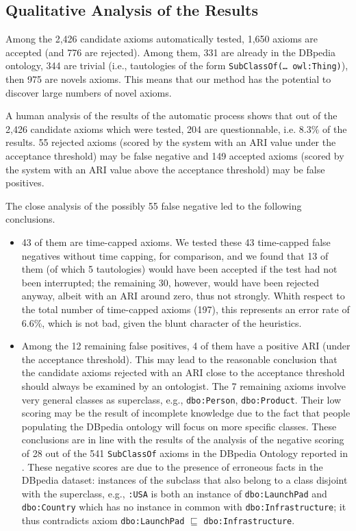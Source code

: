 \documentclass{llncs}
\begin{document}
\subsection{Qualitative Analysis of the Results}
\label{qualitative}

Among the 2,426 candidate axioms automatically tested, 1,650 axioms are accepted (and 776 are rejected).
Among them, 331 are already in the DBpedia ontology, 344 are trivial
(i.e., tautologies of the form \texttt{SubClassOf(\dots\ owl:Thing)}), then 975 are novels axioms.
This means that our method has the potential to discover large numbers of novel axioms.

A human analysis of the results of the automatic process shows that out of the 2,426 candidate axioms which were tested, 204 are questionnable, i.e. $8.3\%$ of the results. 55 rejected axioms (scored by the system with an ARI value under the acceptance threshold) may be false negative and 149 accepted axioms (scored by the system with an ARI value above the acceptance threshold) may be false positives. 

The close analysis of the possibly 55 false negative led to the following conclusions. 
\begin{itemize}

\item 43 of them are time-capped axioms.
We tested these 43 time-capped false negatives without time capping, for comparison,
and we found that 13 of them (of which 5 tautologies) would have been accepted
if the test had not been interrupted; the remaining 30, however, would have been rejected anyway,
albeit with an ARI around zero, thus not strongly.
Whith respect to the total number of time-capped axioms (197), this represents an error rate of 6.6\%,
which is not bad, given the blunt character of the heuristics.
\item Among the 12 remaining false positives, 4 of them have a positive ARI (under the acceptance threshold). This may lead to the reasonable conclusion that the candidate axioms rejected with an ARI close to the acceptance threshold should always be examined by an ontologist. The 7 remaining axioms involve very general classes as superclass, e.g., \texttt{dbo:Person}, \texttt{dbo:Product}. Their low scoring may be the result of incomplete knowledge due to the fact that people populating the DBpedia ontology will focus on more specific classes.
These conclusions are in line with the results of the analysis of the negative scoring of 28 out of the 541 \texttt{SubClassOf} axioms in the DBpedia Ontology reported in \cite{TettamanziFaronZuckerGandon2014ekaw}. These negative scores are due to the presence of erroneous facts in the DBpedia dataset: instances of the subclass that also belong to a class disjoint with the superclass, e.g., \texttt{:USA} is both an instance of \texttt{dbo:LaunchPad} and \texttt{dbo:Country} which has no instance in common with \texttt{dbo:Infrastructure}; it thus contradicts axiom \texttt{dbo:LaunchPad} $\sqsubseteq$ \texttt{dbo:Infrastructure}. 
\end{itemize}
\end{document}
